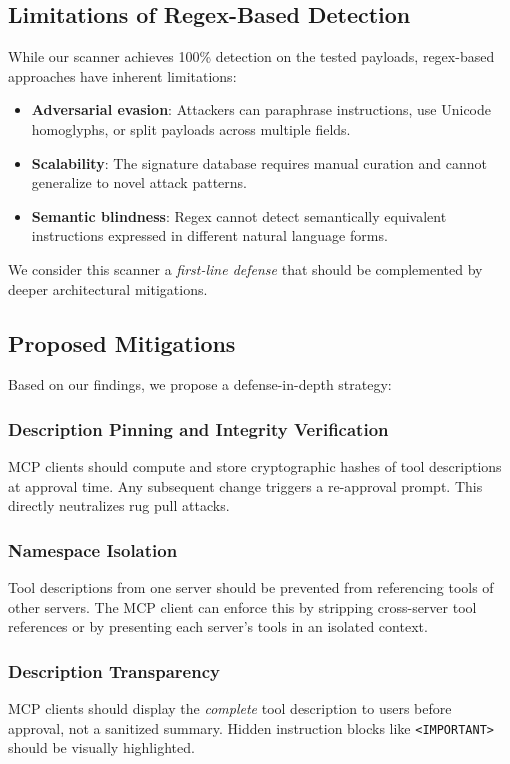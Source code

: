 \documentclass[conference]{IEEEtran}
\begin{document}
\subsection{Limitations of Regex-Based Detection}

While our scanner achieves 100\% detection on the tested payloads, regex-based approaches have inherent limitations:

\begin{itemize}[leftmargin=*]
    \item \textbf{Adversarial evasion}: Attackers can paraphrase instructions, use Unicode homoglyphs, or split payloads across multiple fields.
    \item \textbf{Scalability}: The signature database requires manual curation and cannot generalize to novel attack patterns.
    \item \textbf{Semantic blindness}: Regex cannot detect semantically equivalent instructions expressed in different natural language forms.
\end{itemize}

We consider this scanner a \textit{first-line defense} that should be complemented by deeper architectural mitigations.

\subsection{Proposed Mitigations}

Based on our findings, we propose a defense-in-depth strategy:

\subsubsection{Description Pinning and Integrity Verification}
MCP clients should compute and store cryptographic hashes of tool descriptions at approval time. Any subsequent change triggers a re-approval prompt. This directly neutralizes rug pull attacks.

\subsubsection{Namespace Isolation}
Tool descriptions from one server should be prevented from referencing tools of other servers. The MCP client can enforce this by stripping cross-server tool references or by presenting each server's tools in an isolated context.

\subsubsection{Description Transparency}
MCP clients should display the \textit{complete} tool description to users before approval, not a sanitized summary. Hidden instruction blocks like \texttt{<IMPORTANT>} should be visually highlighted.
\end{document}
